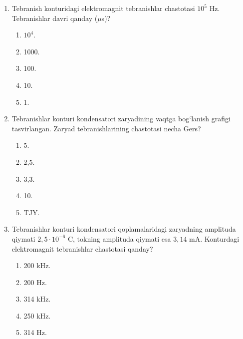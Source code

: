 \begin{enumerate}
\item Tebranish konturidagi elektromagnit tebranishlar chastotasi $10^5$ Hz. Tebranishlar davri qanday ($\mu$s)?
\begin{enumerate}[label=\Alph*)]
\item $10^4$.
\item 1000.
\item 100.
\item 10.
\item 1.
\end{enumerate}

\item Tebranishlar konturi kondensatori zaryadining vaqtga bog‘lanish grafigi tasvirlangan. Zaryad tebranishlarining chastotasi necha Gers?


\begin{enumerate}[label=\Alph*)]
\item 5.
\item 2,5.
\item 3,3.
\item 10.
\item TJY.
\end{enumerate}

\item Tebranishlar konturi kondensatori qoplamalaridagi zaryadning amplituda qiymati $2,5\cdot10^{-6}$ C, tokning amplituda qiymati esa $3,14$ mA. Konturdagi elektromagnit tebranishlar chastotasi qanday?
\begin{enumerate}[label=\Alph*)]
\item 200 kHz.
\item 200 Hz.
\item 314 kHz.
\item 250 kHz.
\item 314 Hz.
\end{enumerate}

\end{enumerate}

